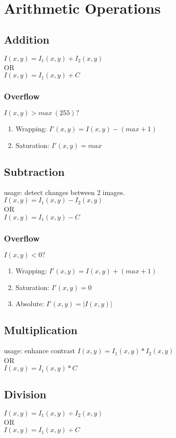 \section{Arithmetic Operations}
\subsection{Addition}
$I(x,y) = I_1(x,y) + I_2(x,y)$\\
OR\\
$I(x,y) = I_1(x,y) + C$\\
\subsubsection{Overflow}
$I(x,y) > max\ (255)?$
\begin{enumerate}
  \item Wrapping: $I'(x,y) = I(x,y) - (max+1)$
  \item Saturation: $ I'(x,y) = max$
\end{enumerate}

\subsection{Subtraction}
usage: detect changes between 2 images.\\
$I(x,y) = I_1(x,y) - I_2(x,y)$\\
OR\\
$I(x,y) = I_1(x,y) - C$\\
\subsubsection{Overflow}
$I(x,y) < 0?$
\begin{enumerate}
  \item Wrapping: $I'(x,y) = I(x,y) + (max+1)$
  \item Saturation: $ I'(x,y) = 0$
  \item Absolute: $ I'(x,y) = |I(x,y)|$
\end{enumerate}
\subsection{Multiplication}
usage: enhance contrast
$I(x,y) = I_1(x,y) * I_2(x,y)$\\
OR\\
$I(x,y) = I_1(x,y) * C$\\
\subsection{Division}
$I(x,y) = I_1(x,y) \div I_2(x,y)$\\
OR\\
$I(x,y) = I_1(x,y) \div C$\\
